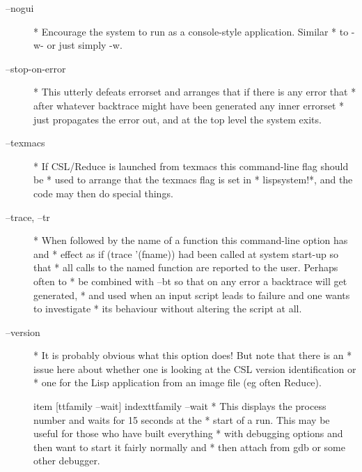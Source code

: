 \documentclass[a4paper,11pt]{article}
\begin{document}
\begin{description}
\item [{\ttfamily --nogui}] 
          * Encourage the system to run as a console-style application. Similar
          * to {\ttfamily -w-} or just simply {\ttfamily -w}.

\item [{\ttfamily --stop-on-error}] 
          * This utterly defeats errorset and arranges that if there is any error that
          * after whatever backtrace might have been generated any inner errorset
          * just propagates the error out, and at the top level the system exits.

\item [{\ttfamily --texmacs}] 
          * If CSL/Reduce is launched from texmacs this command-line flag should be
          * used to arrange that the {\ttfamily texmacs} flag is set in
          * {\ttfamily lispsystem!*}, and the code may then do special things.

\item [{\ttfamily --trace, --tr}] 
          * When followed by the name of a function this command-line option has and
          * effect as if (trace '(fname)) had been called at system start-up so that
          * all calls to the named function are reported to the user. Perhaps often to
          * be combined with --bt so that on any error a backtrace will get generated,
          * and used when an input script leads to failure and one wants to investigate
          * its behaviour without altering the script at all.

\item [{\ttfamily --version}] 
          * It is probably obvious what this option does! But note that there is an
          * issue here about whether one is looking at the CSL version identification or
          * one for the Lisp application from an image file (eg often Reduce).

item [{ttfamily --wait}] index{{ttfamily --wait}}
          * This displays the process number and waits for 15 seconds at the
          * start of a run. This may be useful for those who have built everything
          * with debugging options and then want to start it fairly normally and
          * then attach from gdb or some other debugger.


\end{description}
\end{document}
